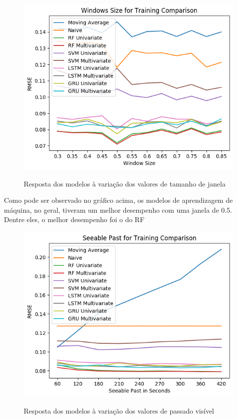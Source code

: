 \begin{figure}[htbp]
    \centering
    \includegraphics[scale=0.8]{monography/img/windows_size_for_training_comparison_rmse.png}
    \label{figure:rf}
    \caption[Resposta dos modelos à variação dos valores de tamanho de janela]{Resposta dos modelos à variação dos valores de tamanho de janela}
\end{figure} 


Como pode ser observado no gráfico acima, os modelos de aprendizagem de máquina, no geral, tiveram um melhor desempenho com uma janela de 0.5. Dentre eles, o melhor desempenho foi o do \acrshort{RF}

\begin{figure}[htbp]
    \centering
    \includegraphics[scale=0.8]{monography/img/seeable_past_for_training_comparison_rmse.png}
    \label{figure:res_past}
    \caption[Resposta dos modelos à variação dos valores de passado visível]{Resposta dos modelos à variação dos valores de passado visível}
\end{figure}

